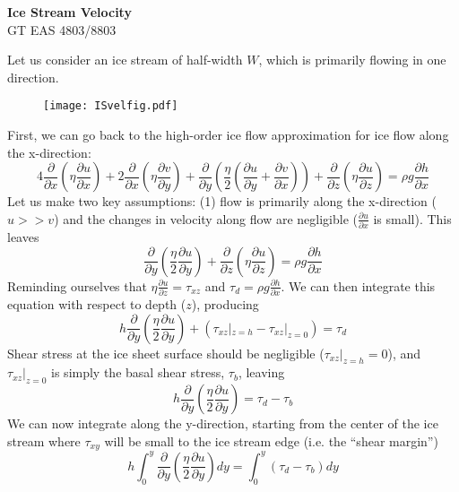 \documentclass[12pt]{article}
\theoremstyle{definition}
\newcommand{\pd}[2]{\frac{\partial {#1}}{\partial {#2}}}
\begin{document}
\thispagestyle{empty}

\begin{center}
{\LARGE \bf Ice Stream Velocity}\\
{\large GT EAS 4803/8803}\\
\end{center}

Let us consider an ice stream of half-width $W$, which is primarily flowing in one direction.

\begin{figure}[h]
  \begin{center}
\texttt{[image: ISvelfig.pdf]}
  \end{center}
  \vspace{-20pt}
\end{figure}

First, we can go back to the high-order ice flow approximation for ice flow along the x-direction:
\begin{equation}
4 \pd{}{x} \left( \eta \pd{u}{x} \right) + 2 \pd{}{x} \left( \eta \pd{v}{y} \right) + \pd{}{y} \left( \frac{\eta}{2} \left(\pd{u}{y} + \pd{v}{x} \right) \right) + \pd{}{z} \left(\eta \pd{u}{z} \right) = \rho g \pd{h}{x}
\end{equation}
Let us make two key assumptions: (1) flow is primarily along the x-direction ($u>>v$) and the changes in velocity along flow are negligible ($\pd{u}{x}$ is small). This leaves
\begin{equation}
\pd{}{y} \left( \frac{\eta}{2} \pd{u}{y} \right) + \pd{}{z} \left(\eta \pd{u}{z} \right) = \rho g \pd{h}{x}
\end{equation}
Reminding ourselves that $\eta \pd{u}{z} = \tau_{xz}$ and $\tau_d = \rho g \pd{h}{x}$. We can then integrate this equation with respect to depth ($z$), producing
\begin{equation}
h \pd{}{y} \left( \frac{\eta}{2} \pd{u}{y} \right) + \left(\tau_{xz}|_{z=h} - \tau_{xz}|_{z=0}  \right) = \tau_d
\end{equation}
Shear stress at the ice sheet surface should be negligible ($\tau_{xz}|_{z=h} = 0$), and $\tau_{xz}|_{z=0}$ is simply the basal shear stress, $\tau_b$, leaving
\begin{equation}
h \pd{}{y} \left( \frac{\eta}{2} \pd{u}{y} \right) = \tau_d - \tau_b
\end{equation}
We can now integrate along the y-direction, starting from the center of the ice stream where $\tau_{xy}$ will be small to the ice stream edge (i.e. the ``shear margin'')
\begin{equation}
h \int_0^y \pd{}{y} \left( \frac{\eta}{2} \pd{u}{y} \right) dy = \int_0^y \left( \tau_d - \tau_b \right) dy
\end{equation}
\end{document}
